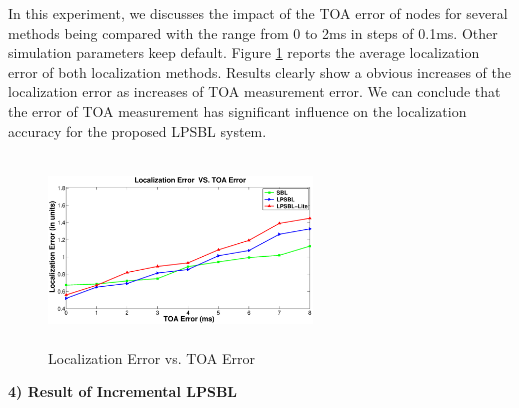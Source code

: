 In this experiment, we discusses the impact of the TOA error of nodes for several methods being compared with the range from 0 to 2ms in steps of 0.1ms. 
Other simulation parameters keep default. 
Figure \ref{fig6} reports the average localization error of both localization methods. 
Results clearly show a obvious increases of the localization error as increases of TOA measurement error.
We can conclude that the error of TOA measurement has significant influence on the localization accuracy for the proposed LPSBL system. 
	 \begin{figure}[htb]       
            \centering
			\vspace{-2mm}
            \includegraphics[height=5.0cm,width=7.0cm]{image/TOA.eps}
                \caption{Localization Error vs. TOA Error}
             \vspace{-3mm}
             \label{fig6}
        \end{figure}

 \textbf{4) Result of Incremental LPSBL} 
 
